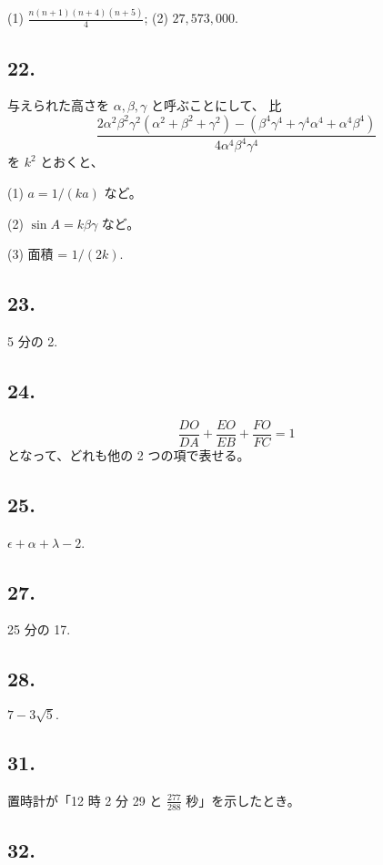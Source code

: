 (1)
$\frac{n (n+1) (n+4) (n+5)}{4}$;
(2)
$27,573,000.$

\subsection*{22.}

与えられた高さを $\alpha, \beta, \gamma$ と呼ぶことにして、
比
\[
\frac{2\alpha^2 \beta^2 \gamma^2 (\alpha^2 + \beta^2 + \gamma^2) - (\beta^4 \gamma^4 + \gamma^4 \alpha^4 + \alpha^4 \beta^4)}{4 \alpha^4 \beta^4 \gamma^4}
\]
を $k^2$ とおくと、

(1) $a = 1/(ka)$ など。

(2) $\sin A = k \beta \gamma$ など。

(3) 面積 = $1 / (2k)$.


\subsection*{23.}

5 分の 2.


\subsection*{24.}
\[
\frac{DO}{DA} + \frac{EO}{EB} + \frac{FO}{FC} = 1
\]
となって、どれも他の 2 つの項で表せる。


\subsection*{25.}

$\epsilon + \alpha + \lambda - 2$.


\subsection*{27.}

25 分の 17.


\subsection*{28.}

$7 - 3 \sqrt{5}.$


\subsection*{31.}

置時計が「12 時 2 分 29 と $\frac{277}{288}$ 秒」を示したとき。

\subsection*{32.}


